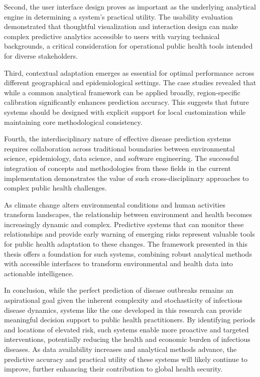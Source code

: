 \documentclass[12pt,a4paper]{report}
\begin{document}
Second, the user interface design proves as important as the underlying analytical engine in determining a system's practical utility. The usability evaluation demonstrated that thoughtful visualization and interaction design can make complex predictive analytics accessible to users with varying technical backgrounds, a critical consideration for operational public health tools intended for diverse stakeholders.

Third, contextual adaptation emerges as essential for optimal performance across different geographical and epidemiological settings. The case studies revealed that while a common analytical framework can be applied broadly, region-specific calibration significantly enhances prediction accuracy. This suggests that future systems should be designed with explicit support for local customization while maintaining core methodological consistency.

Fourth, the interdisciplinary nature of effective disease prediction systems requires collaboration across traditional boundaries between environmental science, epidemiology, data science, and software engineering. The successful integration of concepts and methodologies from these fields in the current implementation demonstrates the value of such cross-disciplinary approaches to complex public health challenges.

As climate change alters environmental conditions and human activities transform landscapes, the relationship between environment and health becomes increasingly dynamic and complex. Predictive systems that can monitor these relationships and provide early warning of emerging risks represent valuable tools for public health adaptation to these changes. The framework presented in this thesis offers a foundation for such systems, combining robust analytical methods with accessible interfaces to transform environmental and health data into actionable intelligence.

In conclusion, while the perfect prediction of disease outbreaks remains an aspirational goal given the inherent complexity and stochasticity of infectious disease dynamics, systems like the one developed in this research can provide meaningful decision support to public health practitioners. By identifying periods and locations of elevated risk, such systems enable more proactive and targeted interventions, potentially reducing the health and economic burden of infectious diseases. As data availability increases and analytical methods advance, the predictive accuracy and practical utility of these systems will likely continue to improve, further enhancing their contribution to global health security.
\end{document}
